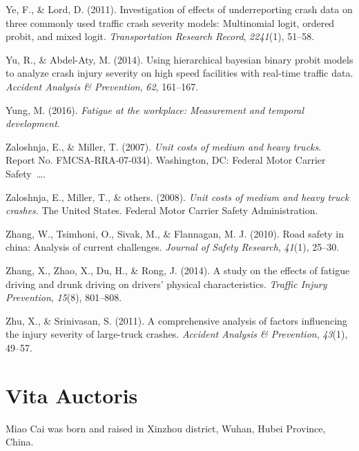 \documentclass[12pt]{book}
\numberwithin{equation}{chapter}
\begin{document}
\leavevmode\hypertarget{ref-ye2011investigation}{}%
Ye, F., \& Lord, D. (2011). Investigation of effects of underreporting crash data on three commonly used traffic crash severity models: Multinomial logit, ordered probit, and mixed logit. \emph{Transportation Research Record}, \emph{2241}(1), 51--58.

\leavevmode\hypertarget{ref-yu2014using}{}%
Yu, R., \& Abdel-Aty, M. (2014). Using hierarchical bayesian binary probit models to analyze crash injury severity on high speed facilities with real-time traffic data. \emph{Accident Analysis \& Prevention}, \emph{62}, 161--167.

\leavevmode\hypertarget{ref-yung2016fatigue}{}%
Yung, M. (2016). \emph{Fatigue at the workplace: Measurement and temporal development}.

\leavevmode\hypertarget{ref-zaloshnja2007unit}{}%
Zaloshnja, E., \& Miller, T. (2007). \emph{Unit costs of medium and heavy trucks}. Report No. FMCSA-RRA-07-034). Washington, DC: Federal Motor Carrier Safety~\ldots{}.

\leavevmode\hypertarget{ref-zaloshnja2008unit}{}%
Zaloshnja, E., Miller, T., \& others. (2008). \emph{Unit costs of medium and heavy truck crashes}. The United States. Federal Motor Carrier Safety Administration.

\leavevmode\hypertarget{ref-zhang2010road}{}%
Zhang, W., Tsimhoni, O., Sivak, M., \& Flannagan, M. J. (2010). Road safety in china: Analysis of current challenges. \emph{Journal of Safety Research}, \emph{41}(1), 25--30.

\leavevmode\hypertarget{ref-zhang2014study}{}%
Zhang, X., Zhao, X., Du, H., \& Rong, J. (2014). A study on the effects of fatigue driving and drunk driving on drivers' physical characteristics. \emph{Traffic Injury Prevention}, \emph{15}(8), 801--808.

\leavevmode\hypertarget{ref-zhu2011comprehensive}{}%
Zhu, X., \& Srinivasan, S. (2011). A comprehensive analysis of factors influencing the injury severity of large-truck crashes. \emph{Accident Analysis \& Prevention}, \emph{43}(1), 49--57.

\doublespacing

\hypertarget{vita-auctoris}{%
\chapter*{Vita Auctoris}\label{vita-auctoris}}

Miao Cai was born and raised in Xinzhou district, Wuhan, Hubei Province, China.





%
%


\backmatter
\end{document}
